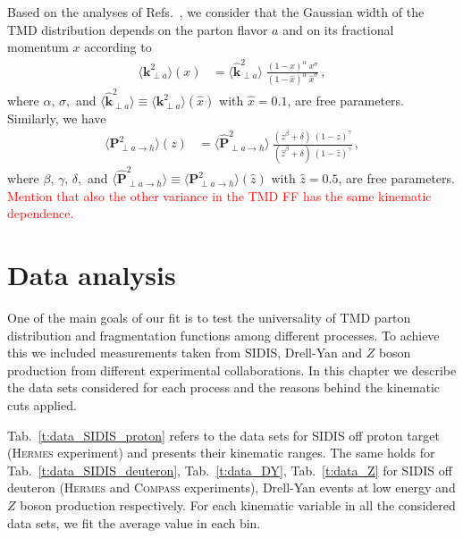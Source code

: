 \documentclass[aps,preprintnumbers,showpacs,nofootinbib,superscriptaddress,floatfix]{revtex4}
\newcommand{\hermes}{\textsc{Hermes }}
\newcommand{\compass}{\textsc{Compass }}
\newcommand{\T}{\perp}
\begin{document}
Based on the analyses of Refs.~\cite{Signori:2013mda,Bacchetta:2015ora}, we
consider that the
Gaussian width of the TMD distribution depends 
on the parton flavor $a$ and on its fractional momentum $x$ according to
\begin{align} 
\big\langle \bm{k}_{\T a}^2 \big\rangle (x) &= \big\langle \hat{\bm{k}}_{\T a}^2 \big\rangle \;  
\frac{(1-x)^{\alpha} \  x^{\sigma} }{ (1 - \hat{x})^{\alpha} \  \hat{x}^{\sigma} } \, ,
\label{e:kT2_kin}
\end{align}
where $\alpha, \, \sigma,$ and $\big\langle \hat{\bm{k}}_{\T a}^2 \big\rangle \equiv \big\langle \bm{k}_{\T a}^2 \big\rangle (\hat{x})$ with $\hat{x} = 0.1$, are free parameters. Similarly, we have
\begin{align}  
\big\langle \bm{P}_{\T a \to h}^2 \big\rangle (z) &= \big\langle \hat{\bm{P}}_{\T a \to h}^2 \big\rangle \  
               \frac{ (z^{\beta} + \delta)\ (1-z)^{\gamma} }{ (\hat{z}^{\beta} + \delta)\   (1 - \hat{z})^{\gamma} } \, ,
 \label{e:PT2_kin}
 \end{align}
where $\beta, \, \gamma, \, \delta, $ and $\big\langle \hat{\bm{P}}_{\T a \to
  h}^2 \big\rangle \equiv \big \langle \bm{P}_{\T a \to h}^2 \big\rangle
(\hat{z})$ with $\hat{z} = 0.5$, are free parameters. 
\textcolor{red}{Mention that also the other variance in the TMD FF has the same kinematic dependence.}
%




\newpage
\section{Data analysis}
\label{s:data_analysis}

One of the main goals of our fit is to test the universality of TMD parton distribution and fragmentation functions among different processes.
To achieve this we included measurements taken from SIDIS, Drell-Yan and $Z$ boson production from different experimental collaborations. 
In this chapter we describe the data sets considered for each process and the reasons behind the kinematic cuts applied.

Tab.~\ref{t:data_SIDIS_proton} refers to the data sets for SIDIS off proton target (\hermes experiment) and presents their kinematic ranges. 
The same holds for Tab.~\ref{t:data_SIDIS_deuteron}, Tab.~\ref{t:data_DY}, Tab.~\ref{t:data_Z} for SIDIS off deuteron (\hermes and \compass experiments), Drell-Yan events at low energy and $Z$ boson production respectively. 
For each kinematic variable in all the considered data sets, we fit the average value in each bin.
 
\end{document}
